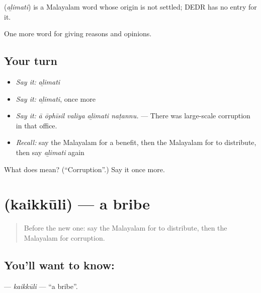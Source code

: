 \begin{cousinweb}
\textbf{} (\emph{aḻimati}) is a Malayalam word whose origin is not settled; DEDR has no entry for it.
\end{cousinweb}

\begin{grammarlens}[title={What you've built}]
One more word for giving reasons and opinions.
\end{grammarlens}

\subsection*{Your turn}
\begin{itemize}
\raggedright
  \item \emph{Say it:} \emph{aḻimati}
  \item \emph{Say it:} \emph{aḻimati}, once more
  \item \emph{Say it:} \emph{ā ōphīsil valiya aḻimati naṭannu.} — There was large-scale corruption in that office.
  \item \emph{Recall:} say the Malayalam for a benefit, then the Malayalam for to distribute, then say \emph{aḻimati} again
\end{itemize}

\begin{tcolorbox}[breakable,colback=teal!4,colframe=teal!35!black,title={Before you move on}]
What does  mean? (\textquotedblleft{}Corruption\textquotedblright{}.) Say it once more.
\end{tcolorbox}
\section[\texorpdfstring{\ml{കൈക്കൂലി} (kaikkūli)}{കൈക്കൂലി (kaikkūli)}]{ (kaikkūli) — a bribe}

\label{lesson:ML-C430-kaikkuli}



\begin{quote}
Before the new one: say the Malayalam for to distribute, then the Malayalam for corruption.
\end{quote}

\subsection*{You'll want to know: }
\textbf{} — \emph{kaikkūli} — \textquotedblleft{}a bribe\textquotedblright{}.

